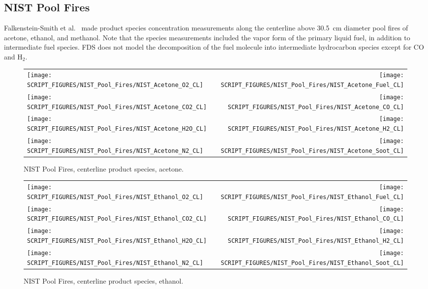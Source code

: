 \clearpage

\subsection{NIST Pool Fires}
\label{sec:NIST_Pool_Fires}

Falkenstein-Smith et al.~\cite{Falkenstein-Smith:2019} made product species concentration measurements along the centerline above 30.5~cm diameter pool fires of acetone, ethanol, and methanol. Note that the species measurements included the vapor form of the primary liquid fuel, in addition to intermediate fuel species. FDS does not model the decomposition of the fuel molecule into intermediate hydrocarbon species except for CO and H$_2$.

\begin{figure}[p]
\begin{tabular*}{\textwidth}{l@{\extracolsep{\fill}}r}
\texttt{[image: SCRIPT\_FIGURES/NIST\_Pool\_Fires/NIST\_Acetone\_O2\_CL]} &
\texttt{[image: SCRIPT\_FIGURES/NIST\_Pool\_Fires/NIST\_Acetone\_Fuel\_CL]} \\
\texttt{[image: SCRIPT\_FIGURES/NIST\_Pool\_Fires/NIST\_Acetone\_CO2\_CL]} &
\texttt{[image: SCRIPT\_FIGURES/NIST\_Pool\_Fires/NIST\_Acetone\_CO\_CL]}    \\
\texttt{[image: SCRIPT\_FIGURES/NIST\_Pool\_Fires/NIST\_Acetone\_H2O\_CL]} &
\texttt{[image: SCRIPT\_FIGURES/NIST\_Pool\_Fires/NIST\_Acetone\_H2\_CL]} \\
\texttt{[image: SCRIPT\_FIGURES/NIST\_Pool\_Fires/NIST\_Acetone\_N2\_CL]} &
\texttt{[image: SCRIPT\_FIGURES/NIST\_Pool\_Fires/NIST\_Acetone\_Soot\_CL]}
\end{tabular*}
\caption[NIST Pool Fires, centerline product species, acetone]{NIST Pool Fires, centerline product species, acetone.}
\label{NIST_Pool_Fires_Acetone}
\end{figure}

\begin{figure}[p]
\begin{tabular*}{\textwidth}{l@{\extracolsep{\fill}}r}
\texttt{[image: SCRIPT\_FIGURES/NIST\_Pool\_Fires/NIST\_Ethanol\_O2\_CL]} &
\texttt{[image: SCRIPT\_FIGURES/NIST\_Pool\_Fires/NIST\_Ethanol\_Fuel\_CL]} \\
\texttt{[image: SCRIPT\_FIGURES/NIST\_Pool\_Fires/NIST\_Ethanol\_CO2\_CL]} &
\texttt{[image: SCRIPT\_FIGURES/NIST\_Pool\_Fires/NIST\_Ethanol\_CO\_CL]}    \\
\texttt{[image: SCRIPT\_FIGURES/NIST\_Pool\_Fires/NIST\_Ethanol\_H2O\_CL]} &
\texttt{[image: SCRIPT\_FIGURES/NIST\_Pool\_Fires/NIST\_Ethanol\_H2\_CL]} \\
\texttt{[image: SCRIPT\_FIGURES/NIST\_Pool\_Fires/NIST\_Ethanol\_N2\_CL]} &
\texttt{[image: SCRIPT\_FIGURES/NIST\_Pool\_Fires/NIST\_Ethanol\_Soot\_CL]}
\end{tabular*}
\caption[NIST Pool Fires, centerline product species, ethanol]{NIST Pool Fires, centerline product species, ethanol.}
\label{NIST_Pool_Fires_Ethanol}
\end{figure}

